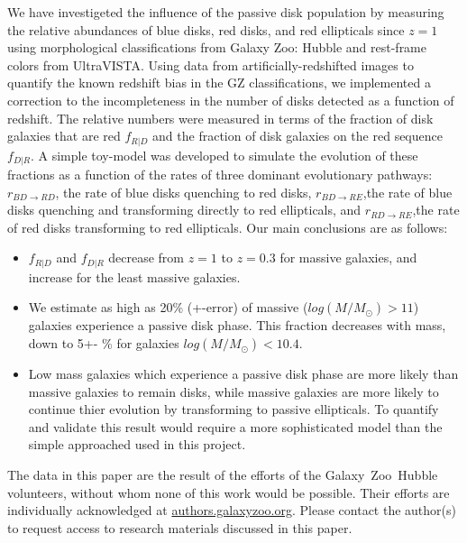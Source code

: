 \documentclass[useAMS,usenatbib]{mn2e}
\begin{document}
We have investigeted the influence of the passive disk population by measuring the relative abundances of blue disks, red disks, and red ellipticals since $z=1$ using morphological classifications from Galaxy Zoo: Hubble and rest-frame colors from UltraVISTA. Using data from artificially-redshifted  images to quantify the known redshift bias in the GZ classifications, we implemented a correction to the incompleteness in the number of disks detected as a function of redshift. The relative numbers were measured in terms of the fraction of disk galaxies that are red $f_{R|D}$ and the fraction of disk galaxies on the red sequence $f_{D|R}$. A simple toy-model was developed to simulate the evolution of these fractions as a function of the rates of three dominant evolutionary pathways: $r_{BD \rightarrow RD}$, the rate of blue disks quenching to red disks, $r_{BD \rightarrow RE}$,the rate of blue disks quenching and transforming directly to red ellipticals, and $r_{RD \rightarrow RE}$,the rate of red disks transforming to red ellipticals. Our main conclusions are as follows:

\begin{itemize}

\item{$f_{R|D}$ and $f_{D|R}$ decrease from $z=1$ to $z=0.3$ for massive galaxies, and increase for the least massive galaxies.}

\item{We estimate as high as 20\% (+-error) of massive ($log(M/M_{\odot})>11$) galaxies experience a passive disk phase. This fraction decreases with mass, down to 5+- \% for galaxies $log(M/M_{\odot})<10.4$.}

\item{Low mass galaxies which experience a passive disk phase are more likely than massive galaxies to remain disks, while massive galaxies are more likely to continue thier evolution by transforming to passive ellipticals. To quantify and validate this result would require a more sophisticated model than the simple approached used in this project.}


\end{itemize}





The data in this paper are the result of the efforts of the Galaxy~Zoo~Hubble volunteers, without whom none of this work would be possible. Their efforts are individually acknowledged at \url{authors.galaxyzoo.org}. Please contact the author(s) to request access to research materials discussed in this paper. 
\end{document}
